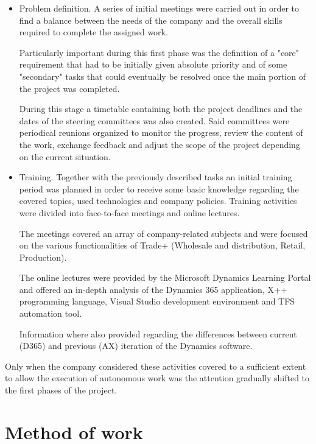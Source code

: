 \begin{itemize}
    \item Problem definition. A series of initial meetings were carried out in order to find a balance between the needs of the company and the overall skills required to complete the assigned work. 
    
    Particularly important during this first phase was the definition of a "core" requirement that had to be initially given absolute priority and of some "secondary" tasks that could eventually be resolved once the main portion of the project was completed.
    
    During this stage a timetable containing both the project deadlines and the dates of the steering committees was also created. Said committees were periodical reunions organized to monitor the progress, review the content of the work, exchange feedback and adjust the scope of the project depending on the current situation.
    
    \item Training. Together with the previously described tasks an initial training period was planned in order to receive some basic knowledge regarding the covered topics, used technologies and company policies. Training activities were divided into face-to-face meetings and online lectures.
    
    The meetings covered an array of company-related subjects and were focused on the various functionalities of Trade+ (Wholesale and distribution, Retail, Production).
    
    The online lectures were provided by the Microsoft Dynamics Learning Portal and offered an in-depth analysis of the Dynamics 365 application, X++ programming language, Visual Studio development environment and TFS automation tool. 
    
    Information where also provided regarding the differences between current (D365) and previous (AX) iteration of the Dynamics software.
\end{itemize}

Only when the company considered these activities covered to a sufficient extent to allow the execution of autonomous work was the attention gradually shifted to the first phases of the project.

\section{Method of work}

